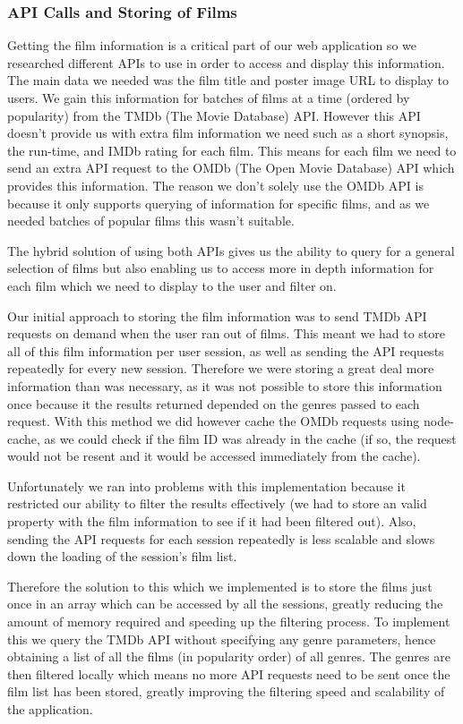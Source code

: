\documentclass{article}
\begin{document}
\subsubsection{API Calls and Storing of Films}
\label{subsubsec:api}
Getting the film information is a critical part of our web application so we researched different APIs to use in order to access and display this information. The main data we needed was the film title and poster image URL to display to users. We gain this information for batches of films at a time (ordered by popularity) from the TMDb (The Movie Database) API. However this API doesn’t provide us with extra film information we need such as a short synopsis, the run-time, and IMDb rating for each film. This means for each film we need to send an extra API request to the OMDb (The Open Movie Database) API which provides this information. The reason we don’t solely use the OMDb API is because it only supports querying of information for specific films, and as we needed batches of popular films this wasn't suitable. 

The hybrid solution of using both APIs gives us the ability to query for a general selection of films but also enabling us to access more in depth information for each film which we need to display to the user and filter on.

Our initial approach to storing the film information was to send TMDb API requests on demand when the user ran out of films. This meant we had to store all of this film information per user session, as well as sending the API requests repeatedly for every new session. Therefore we were storing a great deal more information than was necessary, as it was not possible to store this information once because it the results returned depended on the genres passed to each request. With this method we did however cache the OMDb requests using node-cache, as we could check if the film ID was already in the cache (if so, the request would not be resent and it would be accessed immediately from the cache).

Unfortunately we ran into problems with this implementation because it restricted our ability to filter the results effectively (we had to store an valid property with the film information to see if it had been filtered out). Also, sending the API requests for each session repeatedly is less scalable and slows down the loading of the session’s film list.

Therefore the solution to this which we implemented is to store the films just once in an array which can be accessed by all the sessions, greatly reducing the amount of memory required and speeding up the filtering process. To implement this we query the TMDb API without specifying any genre parameters, hence obtaining a list of all the films (in popularity order) of all genres. The genres are then filtered locally which means no more API requests need to be sent once the film list has been stored, greatly improving the filtering speed and scalability of the application.
\end{document}
